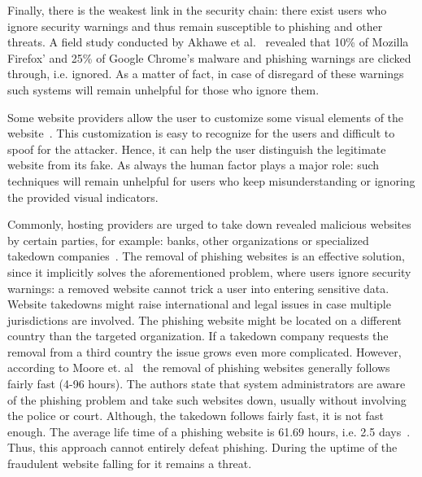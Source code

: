 \begin{description}[leftmargin=0cm]
  Finally, there is the weakest link in the security chain: there exist users who ignore security warnings and thus remain susceptible to phishing and other threats.
A field study conducted by Akhawe et al.~\cite{akhawe2013alice} revealed that 10\% of Mozilla Firefox' and 25\% of Google Chrome's malware and phishing warnings are clicked through, i.e. ignored.
 As a matter of fact, in case of disregard of these warnings such systems will remain unhelpful for those who ignore them. 
	\item[Visual Distinction:] Some website providers allow the user to customize some visual elements of the website~\cite{dhamija2005battle}.
This customization is easy to recognize for the users and difficult to spoof for the attacker.
Hence, it can help the user distinguish the legitimate website from its fake.
As always the human factor plays a major role: such techniques will remain unhelpful for users who keep misunderstanding or ignoring the provided visual indicators. 

	\item[Takedown:] Commonly, hosting providers are urged to take down revealed malicious websites by certain parties, for example: banks, other organizations or specialized takedown companies~\cite{moore2007examining}. The removal of phishing websites is an effective solution, since it implicitly solves the aforementioned problem, where users ignore security warnings: a removed website cannot trick a user into entering sensitive data.
Website takedowns might raise international and legal issues in case multiple jurisdictions are involved.
The phishing website might be located on a different country than the targeted organization.
If a takedown company requests the removal from a third country the issue grows even more complicated.
However, according to Moore et. al~\cite{moore2009impact} the removal of phishing websites generally follows fairly fast (4-96 hours).
The authors state that system administrators are aware of the phishing problem and take such websites down, usually without involving the police or court.
Although, the takedown follows fairly fast, it is not fast enough.
The average life time of a phishing website is 61.69 hours, i.e. 2.5 days~\cite{moore2007examining}.
Thus, this approach cannot entirely defeat phishing. During the uptime of the fraudulent website falling for it remains a threat.
\end{description}

